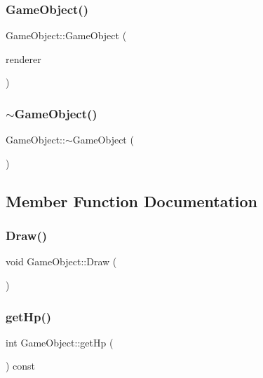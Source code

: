 \subsubsection{\texorpdfstring{Game\+Object()}{GameObject()}}
{\footnotesize\ttfamily Game\+Object\+::\+Game\+Object (\begin{DoxyParamCaption}\item[{S\+D\+L\+\_\+\+Renderer $\ast$}]{renderer }\end{DoxyParamCaption})}

\mbox{\label{class_game_object_ab82dfdb656f9051c0587e6593b2dda97}} 
\subsubsection{\texorpdfstring{$\sim$\+Game\+Object()}{~GameObject()}}
{\footnotesize\ttfamily Game\+Object\+::$\sim$\+Game\+Object (\begin{DoxyParamCaption}{ }\end{DoxyParamCaption})}



\subsection{Member Function Documentation}
\mbox{\label{class_game_object_ad3ac1deac50048cf7a1a19eb0e61ad26}} 
\subsubsection{\texorpdfstring{Draw()}{Draw()}}
{\footnotesize\ttfamily void Game\+Object\+::\+Draw (\begin{DoxyParamCaption}{ }\end{DoxyParamCaption})\hspace{0.3cm}{\ttfamily [virtual]}}

\mbox{\label{class_game_object_a13b96d5c268bca096f8e3a3e85d35732}} 
\subsubsection{\texorpdfstring{get\+Hp()}{getHp()}}
{\footnotesize\ttfamily int Game\+Object\+::get\+Hp (\begin{DoxyParamCaption}{ }\end{DoxyParamCaption}) const}



